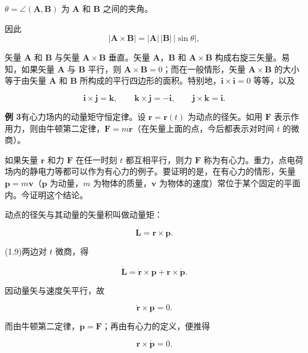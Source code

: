 \documentclass[11pt,a4paper,oneside]{ctexbook}
\newcommand{\ve}[1]{\bm{#1}}
\begin{document}
$\theta = \angle(\ve{A}, \ve{B})$ 为 $\ve{A}$ 和 $\ve{B}$ 之间的夹角。

因此
\begin{equation*}
|\ve{A} \times \ve{B}| = |\ve{A}|\,|\ve{B}|\,|\sin\theta|,
\end{equation*}

矢量 $\ve{A}$ 和 $\ve{B}$ 与矢量 $\ve{A} \times \ve{B}$ 垂直。矢量 $\ve{A}$，$\ve{B}$ 和 $\ve{A} \times \ve{B}$ 构成右旋三矢量。易知，如果矢量 $\ve{A}$ 与 $\ve{B}$ 平行，则 $\ve{A} \times \ve{B} = 0$；而在一般情形，矢量 $\ve{A} \times \ve{B}$ 的大小等于由矢量 $\ve{A}$ 和 $\ve{B}$ 所构成的平行四边形的面积。特别地，$\ve{i} \times \ve{i} = 0$ 等等，以及

\begin{equation*}
\ve{i} \times \ve{j} = \ve{k}, \qquad \ve{k} \times \ve{j} = -\ve{i}, \qquad \ve{j} \times \ve{k} = \ve{i}.
\end{equation*}

\textbf{例 3}\quad 有心力场内的动量矩守恒定律。设 $\ve{r} = \ve{r}(t)$ 为动点的径矢。如用 $\ve{F}$ 表示作用力，则由牛顿第二定律，$\ve{F} = m \ddot{\ve{r}}$（在矢量上面的点，今后都表示对时间 $t$ 的微商）。

如果矢量 $\ve{r}$ 和力 $\ve{F}$ 在任一时刻 $t$ 都互相平行，则力 $\ve{F}$ 称为有心力。重力，点电荷场内的静电力等都可以作为有心力的例子。要证明的是，在有心力的情形，矢量 $\ve{p} = m\ve{v}$（$\ve{p}$ 为动量，$m$ 为物体的质量，$\ve{v}$ 为物体的速度）常位于某个固定的平面内。今证明这个结论。

动点的径矢与其动量的矢量积叫做动量矩：

\begin{equation}
\ve{L} = \ve{r} \times \ve{p}.
\tag{1.9}
\end{equation}

(1.9)两边对 $t$ 微商，得

\begin{equation*}
\dot{\ve{L}} = \dot{\ve{r}} \times \ve{p} + \ve{r} \times \dot{\ve{p}}.
\end{equation*}

因动量矢与速度矢平行，故

\begin{equation*}
\dot{\ve{r}} \times \ve{p} = 0.
\end{equation*}

而由牛顿第二定律，$\dot{\ve{p}} = \ve{F}$；再由有心力的定义，便推得

\begin{equation*}
\ve{r} \times \dot{\ve{p}} = 0.
\end{equation*}
\end{document}
